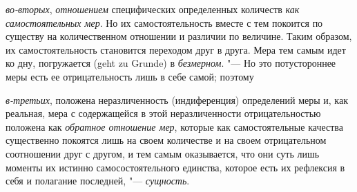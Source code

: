 {\em во-вторых}, {\em отношением}
специфических определенных количеств {\em как
самостоятельных мер}. Но их самостоятельность вместе с тем покоится по
существу на количественном отношении и различии по величине. Таким образом,
их самостоятельность становится переходом друг в друга. Мера тем самым идет
ко дну, погружается (geht zu Grunde) в {\em безмерном}.
"--- Но это потустороннее меры есть ее отрицательность лишь в себе самой;
поэтому

{\em в-третьих}, положена неразличенность (индиференция)
определений меры и, как реальная, мера с содержащейся в этой
неразличенности отрицательностью положена как
{\em обратное отношение мер}, которые как
самостоятельные качества существенно покоятся лишь на своем количестве и на
своем отрицательном соотношении друг с другом, и тем самым оказывается, что
они суть лишь моменты их истинно самосостоятельного единства, которое есть
их рефлексия в себя и полагание последней, "---
{\em сущность}.

